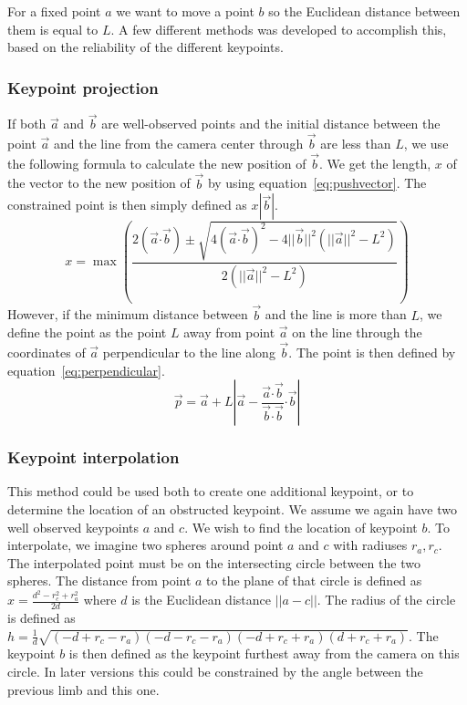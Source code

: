 For a fixed point $a$ we want to move a point $b$ so the Euclidean distance between them is equal to $L$. A few different methods was developed to accomplish this, based on the reliability of the different keypoints.

\subsubsection{Keypoint projection}
If both $\vec{a}$ and $\vec{b}$ are well-observed points and the initial distance between the point $\vec{a}$ and the line from the camera center through $\vec{b}$ are less than $L$, we use the following formula to calculate the new position of $\vec{b}$.
We get the length, $x$ of the vector to the new position of $\vec{b}$ by using equation~\ref{eq:pushvector}. The constrained point is then simply defined as $x|\vec{b}|$.
\begin{equation}
  x = \max\left(\frac{2(\vec{a} \boldsymbol{\cdot} \vec{b}) \pm \sqrt{4(\vec{a} \boldsymbol{\cdot} \vec{b})^{2} - 4 ||\vec{b}||^{2} (||\vec{a}||^{2} - L^{2})}}{2 (||\vec{a}||^{2} - L^{2})}\right)
  \label{eq:pushvector}
\end{equation}
However, if the minimum distance between $\vec{b}$ and the line is more than $L$, we define the point as the point $L$ away from point $\vec{a}$ on the line through the coordinates of $\vec{a}$ perpendicular to the line along $\vec{b}$. The point is then defined by equation~\ref{eq:perpendicular}.
\begin{equation}
  \vec{p} = \vec{a} + L\left|\vec{a} - \frac{\vec{a}\boldsymbol{\cdot}\vec{b}}{\vec{b}\boldsymbol{\cdot}\vec{b}} \boldsymbol{\cdot} \vec{b}\right|
  \label{eq:perpendicular}
\end{equation}

\subsubsection{Keypoint interpolation}
This method could be used both to create one additional keypoint, or to determine the location of an obstructed keypoint. We assume we again have two well observed keypoints $a$ and $c$. We wish to find the location of keypoint $b$.
To interpolate, we imagine two spheres around point $a$ and $c$ with radiuses $r_a, r_c$. The interpolated point must be on the intersecting circle between the two spheres. The distance from point $a$ to the plane of that circle is defined as $x = \frac{d^2 - r_c^2 + r_a^2}{2d}$ where $d$ is the Euclidean distance $||a - c||$. The radius of the circle is defined as $h = \frac{1}{d}\sqrt{(-d+r_c-r_a)(-d-r_c-r_a)(-d+r_c+r_a)(d+r_c+r_a)}$. The keypoint $b$ is then defined as the keypoint furthest away from the camera on this circle. In later versions this could be constrained by the angle between the previous limb and this one.


